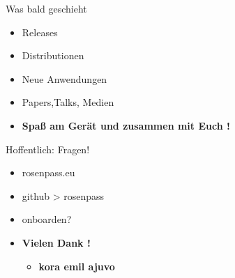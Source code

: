 \documentclass{rosenpass-beamer}
\begin{document}
	\begin{frame}{Was bald geschieht}
		\begin{itemize}
			\item Releases
			\item Distributionen
			\item Neue Anwendungen
			\item Papers,Talks, Medien
		\end{itemize}
	
		\begin{itemize}
			\item \textbf{Spaß am Gerät und zusammen mit Euch !}
		\end{itemize}
	\end{frame}	


	\begin{frame}{Hoffentlich: Fragen!}
		\begin{itemize}
			\item rosenpass.eu
			\item github > rosenpass
			\item onboarden?
		\end{itemize}
	
		\begin{itemize}
			\item \textbf{Vielen Dank !}
			\begin{itemize}
				\item \textbf{kora   emil   ajuvo}
			\end{itemize}	
		\end{itemize}
	\end{frame}	


\clearpage
\setcounter{framenumber}{\totalcontentframes}
\end{document}
